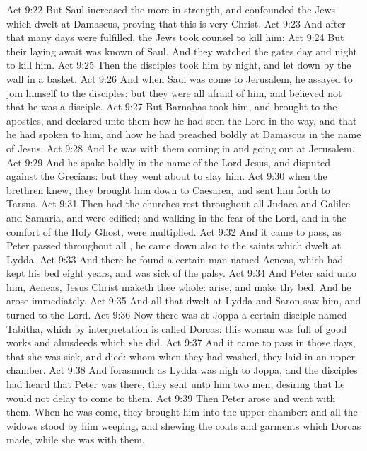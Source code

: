 \vs Act 9:22 But Saul increased the more in strength, and confounded the Jews which dwelt at Damascus, proving that this is very Christ.
\vs Act 9:23 And after that many days were fulfilled, the Jews took counsel to kill him:
\vs Act 9:24 But their laying await was known of Saul. And they watched the gates day and night to kill him.
\vs Act 9:25 Then the disciples took him by night, and let  down by the wall in a basket.
\vs Act 9:26 And when Saul was come to Jerusalem, he assayed to join himself to the disciples: but they were all afraid of him, and believed not that he was a disciple.
\vs Act 9:27 But Barnabas took him, and brought  to the apostles, and declared unto them how he had seen the Lord in the way, and that he had spoken to him, and how he had preached boldly at Damascus in the name of Jesus.
\vs Act 9:28 And he was with them coming in and going out at Jerusalem.
\vs Act 9:29 And he spake boldly in the name of the Lord Jesus, and disputed against the Grecians: but they went about to slay him.
\vs Act 9:30  when the brethren knew, they brought him down to Caesarea, and sent him forth to Tarsus.
\vs Act 9:31 Then had the churches rest throughout all Judaea and Galilee and Samaria, and were edified; and walking in the fear of the Lord, and in the comfort of the Holy Ghost, were multiplied.
\vs Act 9:32 And it came to pass, as Peter passed throughout all , he came down also to the saints which dwelt at Lydda.
\vs Act 9:33 And there he found a certain man named Aeneas, which had kept his bed eight years, and was sick of the palsy.
\vs Act 9:34 And Peter said unto him, Aeneas, Jesus Christ maketh thee whole: arise, and make thy bed. And he arose immediately.
\vs Act 9:35 And all that dwelt at Lydda and Saron saw him, and turned to the Lord.
\vs Act 9:36 Now there was at Joppa a certain disciple named Tabitha, which by interpretation is called Dorcas: this woman was full of good works and almsdeeds which she did.
\vs Act 9:37 And it came to pass in those days, that she was sick, and died: whom when they had washed, they laid  in an upper chamber.
\vs Act 9:38 And forasmuch as Lydda was nigh to Joppa, and the disciples had heard that Peter was there, they sent unto him two men, desiring  that he would not delay to come to them.
\vs Act 9:39 Then Peter arose and went with them. When he was come, they brought him into the upper chamber: and all the widows stood by him weeping, and shewing the coats and garments which Dorcas made, while she was with them.
